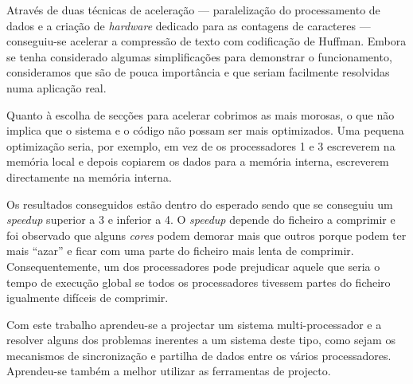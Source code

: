 Através de duas técnicas de aceleração --- paralelização do processamento de dados e a criação de \textit{hardware} dedicado para as contagens de caracteres --- conseguiu-se acelerar a compressão de texto com codificação de Huffman. Embora se tenha considerado algumas simplificações para demonstrar o funcionamento, consideramos que são de pouca importância e que seriam facilmente resolvidas numa aplicação real.

Quanto à escolha de secções para acelerar cobrimos as mais morosas, o que não implica que o sistema e o código não possam ser mais optimizados. Uma pequena optimização seria, por exemplo, em vez de os processadores 1 e 3 escreverem na memória local e depois copiarem os dados para a memória interna, escreverem directamente na memória interna.

Os resultados conseguidos estão dentro do esperado sendo que se conseguiu um \textit{speedup} superior a 3 e inferior a 4. O \textit{speedup} depende do ficheiro a comprimir e foi observado que alguns \textit{cores} podem demorar mais que outros porque podem ter mais ``azar'' e ficar com uma parte do ficheiro mais lenta de comprimir. Consequentemente, um dos processadores pode prejudicar aquele que seria o tempo de execução global se todos os processadores tivessem partes do ficheiro igualmente difíceis de comprimir.

Com este trabalho aprendeu-se a projectar um sistema multi-processador e a resolver alguns dos problemas inerentes a um sistema deste tipo, como sejam os mecanismos de sincronização e partilha de dados entre os vários processadores. Aprendeu-se também a melhor utilizar as ferramentas de projecto.
